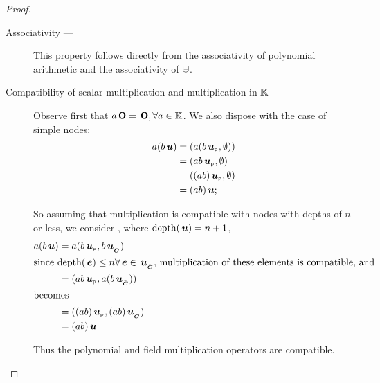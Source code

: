 \begin{proposition}
\begin{proof}
\begin{description}

    \item[Associativity --- ]

      This property follows directly from the associativity of
      polynomial arithmetic and the associativity of $\uplus$.


    \item[Compatibility of scalar multiplication and multiplication in
      $\mathbb{K}$ --- ]

      Observe first that $a \,\boldsymbol{\mathsf{O}} = \,\boldsymbol{\mathsf{O}}, \forall a \in
      \mathbb{K}$. We also dispose with the case of simple nodes:
      \begin{align*}
        a(b \,\boldsymbol{u}) &= (a(b {\,\boldsymbol{u}}_{{}_{\mathsf{P}}}, \emptyset)) \\
        &= (a b {\,\boldsymbol{u}}_{{}_{\mathsf{P}}}, \emptyset) \\
        &= ((a b) {\,\boldsymbol{u}}_{{}_{\mathsf{P}}}, \emptyset) \\
        &= (a b) \,\boldsymbol{u};
      \end{align*}

      So assuming that multiplication is compatible with nodes with
      depths of $n$ or less, we consider , where $\operatorname{depth}(\,\boldsymbol{u})
      = n+1$,
      \begin{align*}
        a (b \,\boldsymbol{u}) &= a (b  {\,\boldsymbol{u}}_{{}_{\mathsf{P}}}, b{\,\boldsymbol{u}}_{{}_{\bar{\boldsymbol{C}}}}) \\
        \intertext{since $\operatorname{depth}(\,\boldsymbol{e}) \leq n \forall \,\boldsymbol{e}\in {\,\boldsymbol{u}}_{{}_{\bar{\boldsymbol{C}}}},$ multiplication of these elements is compatible, and }
        &= (a b\/ {\,\boldsymbol{u}}_{{}_{\mathsf{P}}}, a(b{\,\boldsymbol{u}}_{{}_{\bar{\boldsymbol{C}}}})) \\
        \intertext{becomes}
        &= ((a b) {\,\boldsymbol{u}}_{{}_{\mathsf{P}}}, (a b){\,\boldsymbol{u}}_{{}_{\bar{\boldsymbol{C}}}}) \\
        &= (a b) \,\boldsymbol{u}
      \end{align*}

      Thus the polynomial and field multiplication operators are compatible.


\end{description}
\end{proof}
\end{proposition}
